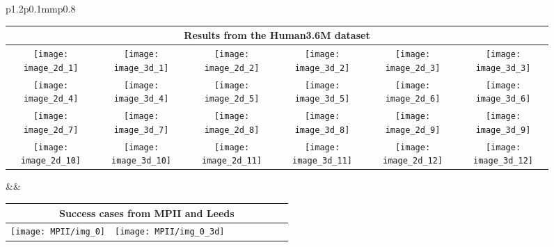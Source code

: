 \documentclass[10pt,twocolumn,letterpaper]{article}
\begin{document}
\begin{figure*}[tbp]\vspace{-5mm}
  \hspace{-13mm}
  \setlength{\tabcolsep}{-3pt}
  \begin{tabular}{p{}p{0.1mm}p{}}
    \begin{center}
      \setlength{\tabcolsep}{1pt}
  \begin{tabular}{cccccc}
    \multicolumn{6}{c}{Results from the Human3.6M dataset}\\
    \toprule
\texttt{[image: image\_2d\_1]}    & 
\texttt{[image: image\_3d\_1]}    & 
\texttt{[image: image\_2d\_2]}    & 
\texttt{[image: image\_3d\_2]}    & 
\texttt{[image: image\_2d\_3]}    & 
\texttt{[image: image\_3d\_3]}    \\
\texttt{[image: image\_2d\_4]}    & 
\texttt{[image: image\_3d\_4]}    & 
\texttt{[image: image\_2d\_5]}    & 
\texttt{[image: image\_3d\_5]}    & 
\texttt{[image: image\_2d\_6]}    & 
\texttt{[image: image\_3d\_6]}    \\
\texttt{[image: image\_2d\_7]}    & 
\texttt{[image: image\_3d\_7]}    & 
\texttt{[image: image\_2d\_8]}    & 
\texttt{[image: image\_3d\_8]}    & 
\texttt{[image: image\_2d\_9]}    & 
\texttt{[image: image\_3d\_9]}    \\
\texttt{[image: image\_2d\_10]}   & 
\texttt{[image: image\_3d\_10]}   & 
\texttt{[image: image\_2d\_11]}   & 
\texttt{[image: image\_3d\_11]}   & 
\texttt{[image: image\_2d\_12]}   & 
\texttt{[image: image\_3d\_12]}   \\
\end{tabular}
\end{center}&&
\begin{center}
\setlength{\tabcolsep}{1pt}
  \begin{tabular}{cccccccc}
    \multicolumn{8}{c}{ Success cases from MPII and Leeds}\\
    \toprule
\texttt{[image: MPII/img\_0]}    & 
\texttt{[image: MPII/img\_0\_3d]} & 

\end{tabular}
\end{center}
\end{tabular}
\end{figure*}
\end{document}
